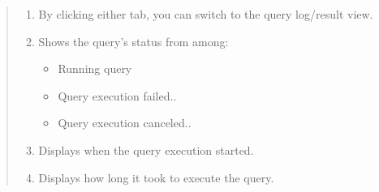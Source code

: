 \documentclass[letterpaper,10pt,english]{sphinxmanual}
\begin{document}
\begin{quote}
\begin{enumerate}
\item {} 
 By clicking either tab, you can switch to the query log/result view.

\item {} 
 Shows the query’s status from among:
\begin{itemize}
\item {} 
Running query

\item {} 
Query execution failed..

\item {} 
Query execution canceled..

\end{itemize}

\item {} 
 Displays when the query execution started.

\item {} 
 Displays how long it took to execute the query.

\end{enumerate}
\end{quote}
\end{document}

